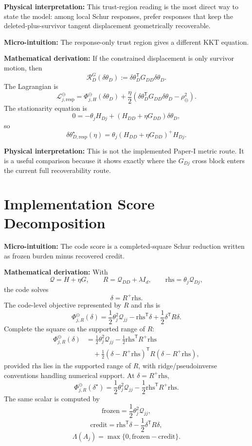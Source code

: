 \documentclass[10pt,twocolumn]{article}
\newcommand{\rhs}{\mathrm{rhs}}
\newcommand{\blocktitle}[1]{\vspace{2pt}\noindent\textbf{#1}\space}
\newcommand{\micro}[1]{\blocktitle{Micro-intuition:} #1}
\newcommand{\deriv}{\blocktitle{Mathematical derivation:}}
\newcommand{\phys}[1]{\blocktitle{Physical interpretation:} #1}
\begin{document}
\phys{This trust-region reading is the most direct way to state the model: among local Schur responses, prefer responses that keep the deleted-plus-survivor tangent displacement geometrically recoverable.}

\micro{The response-only trust region gives a different KKT equation.}

\deriv
If the constrained displacement is only survivor motion, then
\[
\mathcal R_{D}^{G}(\delta\theta_D)
:=
\delta\theta_D^{\mathsf T}G_{DD}\delta\theta_D.
\]
The Lagrangian is
\[
\mathcal L_{j,\mathrm{resp}}^\ominus
=
\Phi_{j,H}^\ominus(\delta\theta_D)
+
\frac{\eta}{2}
\left(
\delta\theta_D^{\mathsf T}G_{DD}\delta\theta_D-\rho_\ominus^2
\right).
\]
The stationarity equation is
\[
0
=
-\theta_jH_{Dj}
+
(H_{DD}+\eta G_{DD})\delta\theta_D ,
\]
so
\[
\delta\theta_{D,\mathrm{resp}}^\star(\eta)
=
\theta_j(H_{DD}+\eta G_{DD})^+H_{Dj}.
\]

\phys{This is not the implemented Paper-I metric route. It is a useful comparison because it shows exactly where the \(G_{Dj}\) cross block enters the current full recoverability route.}

\section*{Implementation Score Decomposition}

\micro{The code score is a completed-square Schur reduction written as frozen burden minus recovered credit.}

\deriv
With
\[
\mathcal Q=H+\eta G,
\qquad
R=\mathcal Q_{DD}+\lambda I_d,
\qquad
\rhs=\theta_j\mathcal Q_{Dj},
\]
the code solves
\[
\delta=R^+\rhs.
\]
The code-level objective represented by \(R\) and \(\rhs\) is
\[
\Phi_{j,R}^\ominus(\delta)
=
\frac12\theta_j^2\mathcal Q_{jj}
-
\rhs^{\mathsf T}\delta
+
\frac12\delta^{\mathsf T}R\delta.
\]
Complete the square on the supported range of \(R\):
{\small
\[
\begin{aligned}
\Phi_{j,R}^\ominus(\delta)
&=
\frac12\theta_j^2\mathcal Q_{jj}
-
\frac12\rhs^{\mathsf T}R^+\rhs
\\
&\quad
+
\frac12
(\delta-R^+\rhs)^{\mathsf T}
R
(\delta-R^+\rhs),
\end{aligned}
\]
}
provided \(\rhs\) lies in the supported range of \(R\), with ridge/pseudoinverse conventions handling numerical support. At \(\delta=R^+\rhs\),
\[
\Phi_{j,R}^\ominus(\delta^\star)
=
\frac12\theta_j^2\mathcal Q_{jj}
-
\frac12\rhs^{\mathsf T}R^+\rhs.
\]
The same scalar is computed by
\[
\mathrm{frozen}
=
\frac12\theta_j^2\mathcal Q_{jj},
\]
\[
\mathrm{credit}
=
\rhs^{\mathsf T}\delta
-
\frac12\delta^{\mathsf T}R\delta,
\]
\[
\Lambda(A_j)
=
\max\{0,\mathrm{frozen}-\mathrm{credit}\}.
\]
\end{document}
